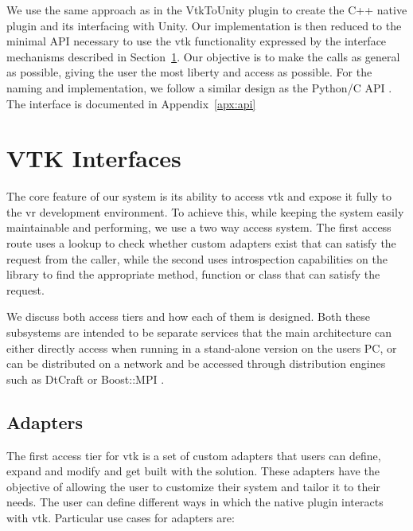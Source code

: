 
We use the same approach as in the VtkToUnity plugin to create the C++ native plugin and its interfacing with Unity. Our implementation is then reduced to the minimal API necessary to use the \acrshort{vtk} functionality expressed by the interface mechanisms described in Section~\ref{sec:design-interfaces}. Our objective is to make the calls as general as possible, giving the user the most liberty and access as possible. For the naming and implementation, we follow a similar design as the Python/C API \cite{python_c_api}. The interface is documented in Appendix~\ref{apx:api}

\section{VTK Interfaces}
\label{sec:design-interfaces}

The core feature of our system is its ability to access \acrshort{vtk} and expose it fully to the \acrshort{vr} development environment. To achieve this, while keeping the system easily maintainable and performing, we use a two way access system. The first access route uses a lookup to check whether custom adapters exist that can satisfy the request from the caller, while the second uses introspection capabilities on the library to find the appropriate method, function or class that can satisfy the request.

We discuss both access tiers and how each of them is designed. Both these subsystems are intended to be separate services that the main architecture can either directly access when running in a stand-alone version on the users PC, or can be distributed on a network and be accessed through distribution engines such as DtCraft \cite{huang2017dtcraft} or Boost::MPI \cite{schaling2011boost}.

\subsection{Adapters}
\label{sec:design-adapters}

The first access tier for \acrshort{vtk} is a set of custom adapters that users can define, expand and modify and get built with the solution. These adapters have the objective of allowing the user to customize their system and tailor it to their needs. The user can define different ways in which the native plugin interacts with \acrshort{vtk}. Particular use cases for adapters are:

